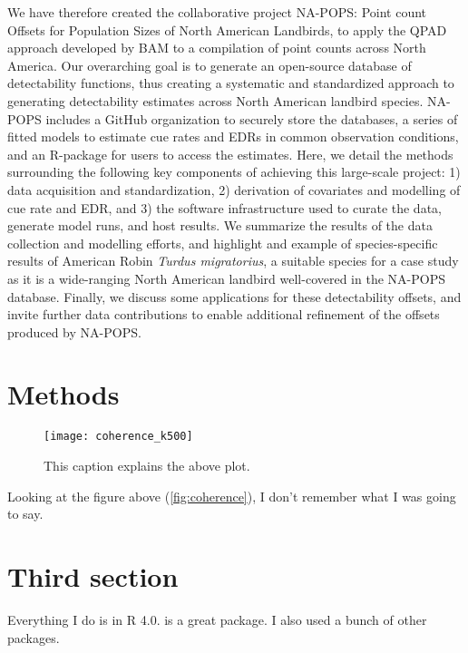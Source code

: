 We have therefore created the collaborative project NA-POPS: Point count Offsets for Population Sizes of North American Landbirds, to apply the QPAD approach developed by BAM to a compilation of point counts across North America. Our overarching goal is to generate an open-source database of detectability functions, thus creating a systematic and standardized approach to generating detectability estimates across North American landbird species. NA-POPS includes a GitHub organization \citep{blischak_quick_2016, crystal-ornelas_not_2022} to securely store the databases, a series of fitted models to estimate cue rates and EDRs in common observation conditions, and an R-package for users to access the estimates. Here, we detail the methods surrounding the following key components of achieving this large-scale project: 1) data acquisition and standardization, 2) derivation of covariates and modelling of cue rate and EDR, and 3) the software infrastructure used to curate the data, generate model runs, and host results. We summarize the results of the data collection and modelling efforts, and highlight and example of species-specific results of American Robin \textit{Turdus migratorius}, a suitable species for a case study as it is a wide-ranging North American landbird well-covered in the NA-POPS database. Finally, we discuss some applications for these detectability offsets, and invite further data contributions to enable additional refinement of the offsets produced by NA-POPS.

\section{Methods}

\begin{figure}[h]
	\centering
	\texttt{[image: coherence\_k500]}
	\caption{\label{fig:coherence}This caption explains the above plot.}
\end{figure}

Looking at the figure above (\autoref{fig:coherence}), I don't remember what I was going to say.





\section{Third section}

Everything I do is in R 4.0\citep{R-4.0.0}. \citep{purrr} is a great package. I also used a
bunch of other packages\citep{qs,dplyr,ggplot2}.
